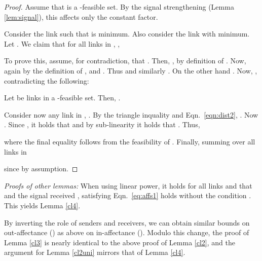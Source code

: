 \documentclass[11pt]{amsart}
\begin{document}
\begin{proof}
Assume that  is a -feasible set. By the signal
strengthening (Lemma \ref{lem:signal}), this affects only the constant factor.

Consider the link  such that  is minimum.
Also consider the link  with  minimum.
Let . We claim that for all links  in , ,

To prove this, assume, for contradiction, that . 
Then,  , by definition of . 
Now, again by the definition of ,  
and . 
Thus 
and similarly . 
On the other hand .
Now, , contradicting the following:
  
  \begin{lemma}
Let  be links in a -feasible set.
Then, . 
\label{lem:ind-separation}
\end{lemma}


Consider now any link  in , .
By the triangle inquality and Eqn.~\ref{eqn:dist2}, 
. 
Now . 
Since , it holds that 
 and by sub-linearity it holds that
.
Thus, 

where the final equality follows from the feasibility of .
Finally, summing over all links in 

since  by assumption.
\end{proof}

\medskip

\emph{Proofs of other lemmas:} When using linear power, it holds for all links  and  that
 and the signal received ,
satisfying Eqn.~\ref{eq:affs1} holds without the condition .
This yields Lemma \ref{cl4}.

By inverting the role of senders and receivers, we can obtain similar
bounds on out-affectance () as above on in-affectance ().
Modulo this change, the proof of Lemma \ref{cl3} is nearly identical
to the above proof of Lemma \ref{cl2}, and the argument for Lemma
\ref{cl2uni} mirrors that of Lemma \ref{cl4}.
\end{document}
